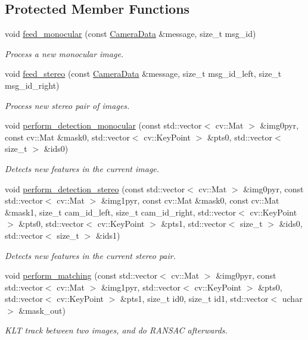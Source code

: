 \subsection*{Protected Member Functions}
\begin{DoxyCompactItemize}
\item 
void \hyperlink{classov__core_1_1TrackKLT_a74d790b70b686f8f4a9788ef765ab3b1}{feed\+\_\+monocular} (const \hyperlink{structov__core_1_1CameraData}{Camera\+Data} \&message, size\+\_\+t msg\+\_\+id)
\begin{DoxyCompactList}\small\item\em Process a new monocular image. \end{DoxyCompactList}\item 
void \hyperlink{classov__core_1_1TrackKLT_a7e0f2b1990992ed7dbd916732dd9d7a9}{feed\+\_\+stereo} (const \hyperlink{structov__core_1_1CameraData}{Camera\+Data} \&message, size\+\_\+t msg\+\_\+id\+\_\+left, size\+\_\+t msg\+\_\+id\+\_\+right)
\begin{DoxyCompactList}\small\item\em Process new stereo pair of images. \end{DoxyCompactList}\item 
void \hyperlink{classov__core_1_1TrackKLT_a8443c645bf05d2ec7e5e14ae44150bcd}{perform\+\_\+detection\+\_\+monocular} (const std\+::vector$<$ cv\+::\+Mat $>$ \&img0pyr, const cv\+::\+Mat \&mask0, std\+::vector$<$ cv\+::\+Key\+Point $>$ \&pts0, std\+::vector$<$ size\+\_\+t $>$ \&ids0)
\begin{DoxyCompactList}\small\item\em Detects new features in the current image. \end{DoxyCompactList}\item 
void \hyperlink{classov__core_1_1TrackKLT_a5c88ad139cd0a0e6633ec604fdee5a86}{perform\+\_\+detection\+\_\+stereo} (const std\+::vector$<$ cv\+::\+Mat $>$ \&img0pyr, const std\+::vector$<$ cv\+::\+Mat $>$ \&img1pyr, const cv\+::\+Mat \&mask0, const cv\+::\+Mat \&mask1, size\+\_\+t cam\+\_\+id\+\_\+left, size\+\_\+t cam\+\_\+id\+\_\+right, std\+::vector$<$ cv\+::\+Key\+Point $>$ \&pts0, std\+::vector$<$ cv\+::\+Key\+Point $>$ \&pts1, std\+::vector$<$ size\+\_\+t $>$ \&ids0, std\+::vector$<$ size\+\_\+t $>$ \&ids1)
\begin{DoxyCompactList}\small\item\em Detects new features in the current stereo pair. \end{DoxyCompactList}\item 
void \hyperlink{classov__core_1_1TrackKLT_a7747a5ceca5c530350cf0c745a33bfe5}{perform\+\_\+matching} (const std\+::vector$<$ cv\+::\+Mat $>$ \&img0pyr, const std\+::vector$<$ cv\+::\+Mat $>$ \&img1pyr, std\+::vector$<$ cv\+::\+Key\+Point $>$ \&pts0, std\+::vector$<$ cv\+::\+Key\+Point $>$ \&pts1, size\+\_\+t id0, size\+\_\+t id1, std\+::vector$<$ uchar $>$ \&mask\+\_\+out)
\begin{DoxyCompactList}\small\item\em K\+LT track between two images, and do R\+A\+N\+S\+AC afterwards. \end{DoxyCompactList}\end{DoxyCompactItemize}
